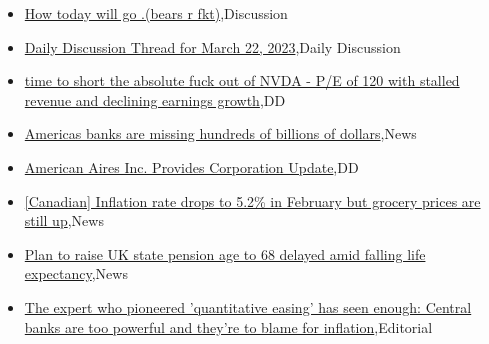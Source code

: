 \documentclass{article}%
\begin{document}
%
\begin{itemize}%
\item%
\href{https://reddit.com/r/wallstreetbets/comments/11yg2ae/how\_today\_will\_go\_bears\_r\_fkt/}{How today will go .(bears r fkt)},Discussion%
\item%
\href{https://reddit.com/r/wallstreetbets/comments/11ye0n3/daily\_discussion\_thread\_for\_march\_22\_2023/}{Daily Discussion Thread for March 22, 2023},Daily Discussion%
\item%
\href{https://reddit.com/r/wallstreetbets/comments/11ydq3o/time\_to\_short\_the\_absolute\_fuck\_out\_of\_nvda\_pe\_of/}{time to short the absolute fuck out of NVDA - P/E of 120 with stalled revenue and declining earnings growth},DD%
\item%
\href{https://reddit.com/r/wallstreetbets/comments/11yb13a/americas\_banks\_are\_missing\_hundreds\_of\_billions/}{Americas banks are missing hundreds of billions of dollars},News%
\item%
\href{https://reddit.com/r/Baystreetbets/comments/11y9pgu/american\_aires\_inc\_provides\_corporation\_update/}{American Aires Inc. Provides Corporation Update},DD%
\item%
\href{https://reddit.com/r/Economics/comments/11xzcgu/canadian\_inflation\_rate\_drops\_to\_52\_in\_february/}{[Canadian] Inflation rate drops to 5.2\% in February  but grocery prices are still up},News%
\item%
\href{https://reddit.com/r/Economics/comments/11xws8e/plan\_to\_raise\_uk\_state\_pension\_age\_to\_68\_delayed/}{Plan to raise UK state pension age to 68 delayed amid falling life expectancy},News%
\item%
\href{https://reddit.com/r/Economics/comments/11xnt3g/the\_expert\_who\_pioneered\_quantitative\_easing\_has/}{The expert who pioneered 'quantitative easing' has seen enough: Central banks are too powerful and they're to blame for inflation},Editorial%
\end{itemize}%
\end{document}

